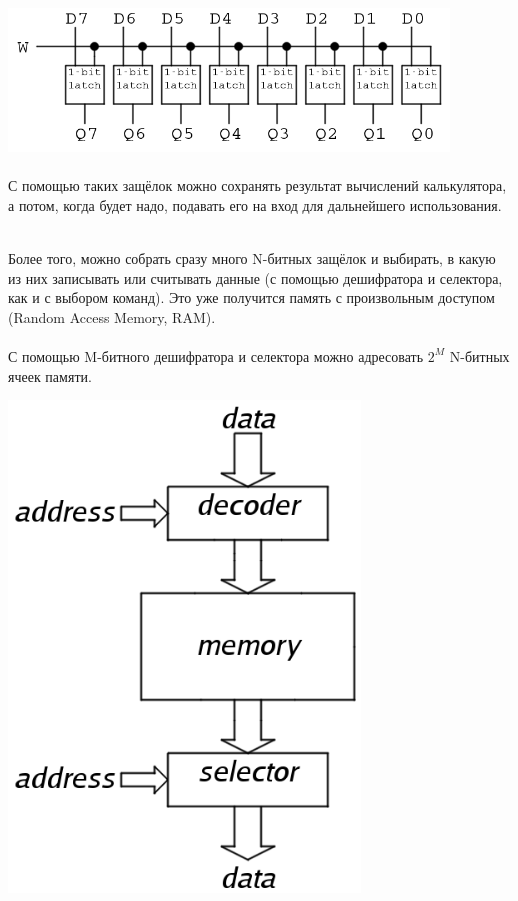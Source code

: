 \documentclass[11pt]{book}
\begin{document}
\includegraphics[height=1.5in]{pic/latch_8_bit.png}
\\ \\
С помощью таких защёлок можно сохранять результат вычислений калькулятора, а потом, когда будет надо,
подавать его на вход для дальнейшего использования.
\\ \\
\begin{minipage}{0.7\textwidth}
Более того, можно собрать сразу много N-битных защёлок и выбирать, в какую из них записывать или считывать данные
(с помощью дешифратора и селектора, как и с выбором команд).
Это уже получится память с произвольным доступом (Random Access Memory, RAM).
\\ \\
С помощью M-битного дешифратора и селектора можно адресовать $2^M$ N-битных ячеек памяти.
\end{minipage}
\begin{minipage}{0.3\textwidth}
\centering
\includegraphics[width=0.7\textwidth]{pic/ram.png}
\end{minipage}
\end{document}
